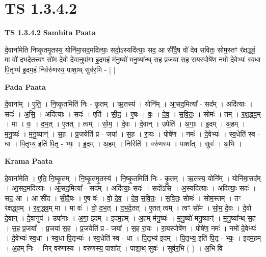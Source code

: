 \documentclass[17pt]{extarticle}
\begin{document}
\section*{ TS 1.3.4.2 }

\textbf{TS 1.3.4.2 } \newline
\textbf{Samhita Paata} \newline

दे॒वाना॑मेति निष्कृ॒तमृ॒तस्य॒ योनि॑मा॒सद॒मदि॑त्याः॒ सदो॒ऽस्यदि॑त्याः॒ सद॒ आ सी॑दै॒ष वो॑ देव सवितः॒ सोम॒स्तꣳ र॑क्षद्ध्वं॒ मा वो॑ दभदे॒तत्त्वꣳ सो॑म दे॒वो दे॒वानुपा॑गा इ॒दम॒हं म॑नु॒ष्यो॑ मनु॒ष्या᳚न्थ् स॒ह प्र॒जया॑ स॒ह रा॒यस्पोषे॑ण॒ नमो॑ दे॒वेभ्यः॑ स्व॒धा पि॒तृभ्य॑ इ॒दम॒हं निर्वरु॑णस्य॒ पाशा॒थ् सुव॑र॒भि - [ ] \newline

\textbf{Pada Paata} \newline

दे॒वाना᳚म् । ए॒ति॒ । नि॒ष्कृ॒तमिति॑ निः - कृ॒तम् । ऋ॒तस्य॑ । योनि᳚म् । आ॒सद॒मित्या᳚ - सद᳚म् । अदि॑त्याः । सदः॑ । अ॒सि॒ । अदि॑त्याः । सदः॑ । एति॑ । सी॒द॒ । ए॒षः । वः॒ । दे॒व॒ । स॒वि॒तः॒ । सोमः॑ । तम् । र॒क्ष॒द्ध्व॒म् । मा । वः॒ । द॒भ॒॒त् । ए॒तत् । त्वम् । सो॒म॒ । दे॒वः । दे॒वान् । उपेति॑ । अ॒गाः॒ । इ॒दम् । अ॒हम् । म॒नु॒ष्यः॑ । म॒नु॒ष्यान्॑ । स॒ह । प्र॒जयेति॑ प्र - जया᳚ । स॒ह । रा॒यः । पोषे॑ण । नमः॑ । दे॒वेभ्यः॑ । स्व॒धेति॑ स्व - धा । पि॒तृभ्य॒ इति॑ पि॒तृ - भ्यः॒ । इ॒दम् । अ॒हम् । निरिति॑ । वरु॑णस्य । पाशा᳚त् । सुवः॑ । अ॒भि ।  \newline


\textbf{Krama Paata} \newline

दे॒वाना॑मेति । ए॒ति॒ नि॒ष्कृ॒तम् । नि॒ष्कृ॒तमृ॒तस्य॑ । नि॒ष्कृ॒तमिति॑ निः - कृ॒तम् । ऋ॒तस्य॒ योनि᳚म् । योनि॑मा॒सद᳚म् । आ॒सद॒मदि॑त्याः । आ॒सद॒मित्या᳚ - सद᳚म् । अदि॑त्याः॒ सदः॑ । सदो॑ऽसि । अ॒स्यदि॑त्याः । अदि॑त्याः॒ सदः॑ । सद॒ आ । आ सी॑द । सी॒दै॒षः । ए॒ष वः॑ । वो॒ दे॒व॒ । दे॒व॒ स॒वि॒तः॒ । स॒वि॒तः॒ सोमः॑ । सोम॒स्तम् । तꣳ र॑क्षद्ध्वम् । र॒क्ष॒द्ध्व॒म् मा । मा वः॑ । वो॒ द॒भ॒त् । द॒भ॒दे॒तत् । ए॒तत् त्वम् । त्वꣳ सो॑म । सो॒म॒ दे॒वः । दे॒वो दे॒वान् । दे॒वानुप॑ । उपा॑गाः । अ॒गा॒ इ॒दम् । इ॒दम॒हम् । अ॒हम् म॑नु॒ष्यः॑ । म॒नु॒ष्यो॑ मनु॒ष्यान्॑ । म॒नु॒ष्या᳚न्थ् स॒ह । स॒ह प्र॒जया᳚ । प्र॒जया॑ स॒ह । प्र॒जयेति॑ प्र - जया᳚ । स॒ह रा॒यः । रा॒यस्पोषे॑ण । पोषे॑ण॒ नमः॑ । नमो॑ दे॒वेभ्यः॑ । दे॒वेभ्यः॑ स्व॒धा । स्व॒धा पि॒तृभ्यः॑ । स्व॒धेति॑ स्व - धा । पि॒तृभ्य॑ इ॒दम् । पि॒तृभ्य॒ इति॑ पि॒तृ - भ्यः॒ । इ॒दम॒हम् । अ॒हम् निः । निर् वरु॑णस्य । वरु॑णस्य॒ पाशा᳚त् । पाशा॒थ् सुवः॑ । सुव॑र॒भि ( ) । अ॒भि वि \newline
\end{document}
